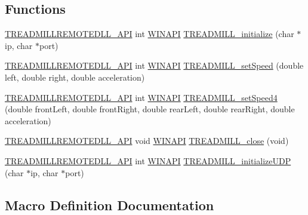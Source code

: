 \subsection*{Functions}
\begin{DoxyCompactItemize}
\item 
\hyperlink{treadmill-remote_8h_a227455497d4d32bfe49f1f795b27c6cc}{T\+R\+E\+A\+D\+M\+I\+L\+L\+R\+E\+M\+O\+T\+E\+D\+L\+L\+\_\+\+A\+PI} int \hyperlink{treadmill-remote_8h_a9aa60e1ead64be77ad551e745cbfd4d3}{W\+I\+N\+A\+PI} \hyperlink{treadmill-remote_8h_a9359937c6d3e08d705bc274f0f479032}{T\+R\+E\+A\+D\+M\+I\+L\+L\+\_\+initialize} (char $\ast$ip, char $\ast$port)
\item 
\hyperlink{treadmill-remote_8h_a227455497d4d32bfe49f1f795b27c6cc}{T\+R\+E\+A\+D\+M\+I\+L\+L\+R\+E\+M\+O\+T\+E\+D\+L\+L\+\_\+\+A\+PI} int \hyperlink{treadmill-remote_8h_a9aa60e1ead64be77ad551e745cbfd4d3}{W\+I\+N\+A\+PI} \hyperlink{treadmill-remote_8h_a2bd100ba2ff484a153eb10936b9385b5}{T\+R\+E\+A\+D\+M\+I\+L\+L\+\_\+set\+Speed} (double left, double right, double acceleration)
\item 
\hyperlink{treadmill-remote_8h_a227455497d4d32bfe49f1f795b27c6cc}{T\+R\+E\+A\+D\+M\+I\+L\+L\+R\+E\+M\+O\+T\+E\+D\+L\+L\+\_\+\+A\+PI} int \hyperlink{treadmill-remote_8h_a9aa60e1ead64be77ad551e745cbfd4d3}{W\+I\+N\+A\+PI} \hyperlink{treadmill-remote_8h_a677a8f38324cc71d8f5684f925719681}{T\+R\+E\+A\+D\+M\+I\+L\+L\+\_\+set\+Speed4} (double front\+Left, double front\+Right, double rear\+Left, double rear\+Right, double acceleration)
\item 
\hyperlink{treadmill-remote_8h_a227455497d4d32bfe49f1f795b27c6cc}{T\+R\+E\+A\+D\+M\+I\+L\+L\+R\+E\+M\+O\+T\+E\+D\+L\+L\+\_\+\+A\+PI} void \hyperlink{treadmill-remote_8h_a9aa60e1ead64be77ad551e745cbfd4d3}{W\+I\+N\+A\+PI} \hyperlink{treadmill-remote_8h_a884dca17af0cb6c068caeadc3ebe9a5e}{T\+R\+E\+A\+D\+M\+I\+L\+L\+\_\+close} (void)
\item 
\hyperlink{treadmill-remote_8h_a227455497d4d32bfe49f1f795b27c6cc}{T\+R\+E\+A\+D\+M\+I\+L\+L\+R\+E\+M\+O\+T\+E\+D\+L\+L\+\_\+\+A\+PI} int \hyperlink{treadmill-remote_8h_a9aa60e1ead64be77ad551e745cbfd4d3}{W\+I\+N\+A\+PI} \hyperlink{treadmill-remote_8h_a01211c9d8d73f3013e38c822be71871b}{T\+R\+E\+A\+D\+M\+I\+L\+L\+\_\+initialize\+U\+DP} (char $\ast$ip, char $\ast$port)
\end{DoxyCompactItemize}


\subsection{Macro Definition Documentation}
\mbox{\label{treadmill-remote_8h_a227455497d4d32bfe49f1f795b27c6cc}} 
